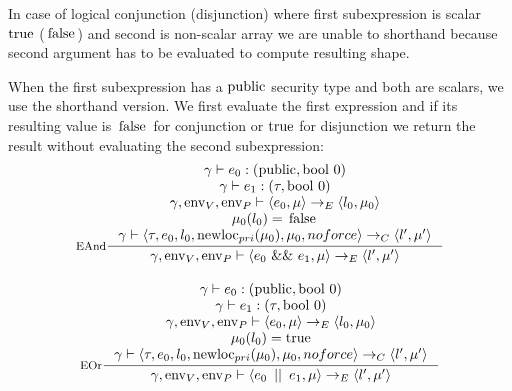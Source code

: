 \documentclass[a4paper, 10pt, draft]{report}
\DeclareMathOperator*{\env}{env}
\DeclareMathOperator*{\newloc}{newloc}
\newcommand{\mycode}[1]{\ensuremath{\mbox{\lstinline{#1}}}}
\begin{document}
In case of logical conjunction (disjunction) where first subexpression is
scalar \mycode{true} (\mycode{false}) and second is non-scalar array we are
unable to shorthand because second argument has to be evaluated to compute
resulting shape.

When the first subexpression has a \mycode{public} security type and both are
scalars, we use the shorthand version. We first evaluate the first expression
and if its resulting value is \mycode{false} for conjunction or \mycode{true}
for disjunction we return the result without evaluating the second
subexpression:
\[\begin{array}{c}
\inference[EAnd]{
  \gamma |- e_0 : (\mycode{public}, \mycode{bool}\ 0) \\
  \gamma |- e_1 : (\tau, \mycode{bool}\ 0) \\
  \gamma, \env_V, \env_P |- \left<e_0, \mu \right> \to_E \left< l_0, \mu_0 \right> \\
  \mu_0(l_0) = \mycode{false} \\
  \gamma |- \left< \tau, e_0, l_0, \newloc_{pri}(\mu_0), \mu_0, noforce \right> \to_C \left<l', \mu' \right>
}{
  \gamma, \env_V, \env_P |- \left<e_0\ \mycode{&&}\ e_1, \mu \right> \to_E \left<l', \mu' \right>
} \\[2em]
\inference[EOr]{
  \gamma |- e_0 : (\mycode{public}, \mycode{bool}\ 0) \\
  \gamma |- e_1 : (\tau, \mycode{bool}\ 0) \\
  \gamma, \env_V, \env_P |- \left<e_0, \mu \right> \to_E \left< l_0, \mu_0 \right> \\
  \mu_0(l_0) = \mycode{true} \\
  \gamma |- \left< \tau, e_0, l_0, \newloc_{pri}(\mu_0), \mu_0, noforce \right> \to_C \left<l', \mu' \right>
}{
  \gamma, \env_V, \env_P |- \left<e_0\ \mycode{||}\ e_1, \mu \right> \to_E \left<l', \mu' \right>
}
\end{array}\]
\end{document}
